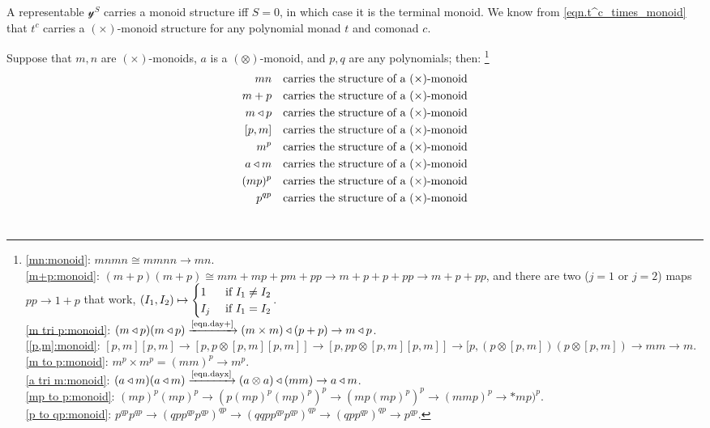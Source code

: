 \documentclass[11pt, one side, article]{memoir}
\theoremstyle{definition}
\theoremstyle{plain}
\newcommand{\To}[2][]{\xrightarrow[#1]{\tn{$#2$}}}
\newcommand{\tn}[1]{\textnormal{#1}}
\newcommand{\yon}{{\mathcal{y}}}
\newcommand{\0}{\textsf{0}}
\newcommand{\1}{\tn{\textsf{1}}}
\newcommand{\tri}{\mathbin{\triangleleft}}
\begin{document}
A representable $\yon^S$ carries a monoid structure iff $S=0$, in which case it is the terminal monoid. We know from \eqref{eqn.t^c_times_monoid} that $t^c$ carries a $(\times)$-monoid structure for any polynomial monad $t$ and comonad $c$.

Suppose that $m,n$ are $(\times)$-monoids, $a$ is a $(\otimes)$-monoid, and $p, q$ are any polynomials; then:%
\footnote{
\eqref{mn:monoid}: $mnmn\cong mmnn\to mn$.\\
\eqref{m+p:monoid}: $(m+p)(m+p)\cong mm+mp+pm+pp\to m+p+p+pp\to m+p+pp$, and there are two ($j=1$ or $j=2$) maps $pp\to 1+p$ that work, $(I_1,I_2)\mapsto\begin{cases}1&\tn{ if }I_1\neq I_2\\I_j&\tn{ if }I_1=I_2\end{cases}$.\\
\eqref{m tri p:monoid}: $(m\tri p)(m\tri p)\To{\eqref{eqn.day+}}(m\times m)\tri(p+p)\to m\tri p$.\\
\eqref{[p,m]:monoid}: $[p,m][p,m]\to[p,p\otimes[p,m][p,m]]\to[p,pp\otimes[p,m][p,m]]\to[p,(p\otimes[p,m])(p\otimes[p,m])\to mm\to m$.\\
\eqref{m to p:monoid}: $m^p\times m^p=(mm)^p\to m^p$.\\
\eqref{a tri m:monoid}: $(a\tri m)(a\tri m)\To{\eqref{eqn.dayx}}(a\otimes a)\tri(mm)\to a\tri m$.\\
\eqref{mp to p:monoid}: $(mp)^p(mp)^p\to(p(mp)^p(mp)^p)^p\to (mp(mp)^p)^p\to (mmp)^p\to *mp)^p$.\\
\eqref{p to qp:monoid}: $p^{qp}p^{qp}\to (qpp^{qp}p^{qp})^{qp}\to(qqpp^{qp}p^{qp})^{qp}\to(qpp^{qp})^{qp}\to p^{qp}$.
}
\begin{align}
	mn&\quad\tn{carries the structure of a $(\times)$-monoid}\label{mn:monoid}\\
	m+p&\quad\tn{carries the structure of a $(\times)$-monoid}\label{m+p:monoid}\\
	m\tri p&\quad\tn{carries the structure of a $(\times)$-monoid}\label{m tri p:monoid}\\
	[p,m]&\quad\tn{carries the structure of a $(\times)$-monoid}\label{[p,m]:monoid}\\
	m^p&\quad\tn{carries the structure of a $(\times)$-monoid}\label{m to p:monoid}\\
	a\tri m&\quad\tn{carries the structure of a $(\times)$-monoid}\label{a tri m:monoid}\\
	(mp)^p&\quad\tn{carries the structure of a $(\times)$-monoid}\label{mp to p:monoid}\\
	p^{qp}&\quad\tn{carries the structure of a $(\times)$-monoid}\label{p to qp:monoid}
\end{align}
\
\end{document}

